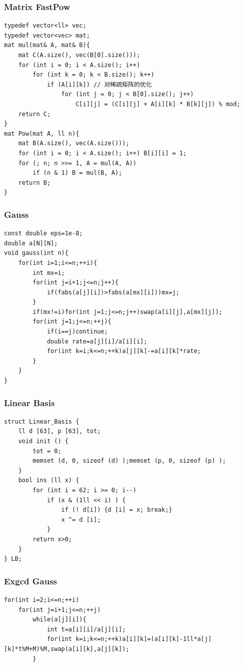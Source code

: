 \documentclass[twoside]{article}
\begin{document}
\subsubsection{Matrix FastPow}
\begin{lstlisting}
typedef vector<ll> vec;
typedef vector<vec> mat;
mat mul(mat& A, mat& B){
    mat C(A.size(), vec(B[0].size()));
    for (int i = 0; i < A.size(); i++)
        for (int k = 0; k < B.size(); k++)
            if (A[i][k]) // 对稀疏矩阵的优化
                for (int j = 0; j < B[0].size(); j++)
                    C[i][j] = (C[i][j] + A[i][k] * B[k][j]) % mod;
    return C;
}
mat Pow(mat A, ll n){
    mat B(A.size(), vec(A.size()));
    for (int i = 0; i < A.size(); i++) B[i][i] = 1;
    for (; n; n >>= 1, A = mul(A, A))
        if (n & 1) B = mul(B, A);
    return B;
}\end{lstlisting}
\subsubsection{Gauss}
\begin{lstlisting}
const double eps=1e-8;
double a[N][N];
void gauss(int n){
	for(int i=1;i<=n;++i){
		int mx=i;
        for(int j=i+1;j<=n;j++){
            if(fabs(a[j][i])>fabs(a[mx][i]))mx=j;
        }
        if(mx!=i)for(int j=1;j<=n;j++)swap(a[i][j],a[mx][j]);
		for(int j=1;j<=n;++j){
			if(i==j)continue;
			double rate=a[j][i]/a[i][i];
			for(int k=i;k<=n;++k)a[j][k]-=a[i][k]*rate;
		}
	}
}
\end{lstlisting}
\subsubsection{Linear Basis}
\begin{lstlisting}
struct Linear_Basis {
    ll d [63], p [63], tot;
    void init () {
        tot = 0;
        memset (d, 0, sizeof (d) );memset (p, 0, sizeof (p) );
    }
    bool ins (ll x) {
        for (int i = 62; i >= 0; i--)
            if (x & (1ll << i) ) {
                if (! d[i]) {d [i] = x; break;}
                x ^= d [i];
            }
        return x>0;
    }
} LB;
\end{lstlisting}
\subsubsection{Exgcd Gauss}
\begin{lstlisting}
for(int i=2;i<=n;++i)
    for(int j=i+1;j<=n;++j)
        while(a[j][i]){
            int t=a[i][i]/a[j][i];
            for(int k=i;k<=n;++k)a[i][k]=(a[i][k]-1ll*a[j][k]*t%M+M)%M,swap(a[i][k],a[j][k]);
        }
\end{lstlisting}
\end{document}

